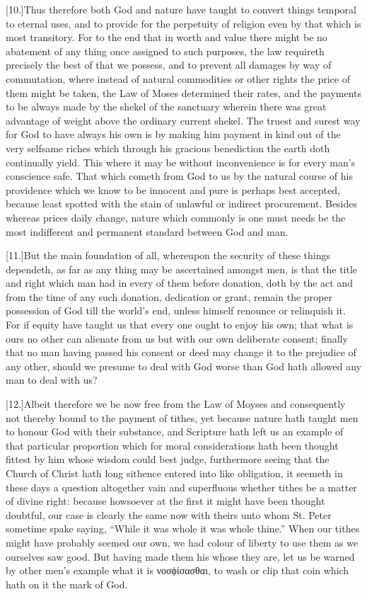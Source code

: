[10.]Thus therefore both God and nature have taught to convert things temporal to eternal uses, and to provide for the perpetuity of religion even by that which is most transitory. For to the end that in worth and value there might be no abatement of any thing once assigned to such purposes, the law requireth precisely the best of that we possess, and to prevent all damages by way of commutation, where instead of natural commodities or other rights the price of them might be taken, the Law of Moses determined their rates, and the payments to be always made by the shekel of the sanctuary wherein there was great advantage of weight above the ordinary current shekel. The truest and surest way for God to have always his own is by making him payment in kind out of the very selfsame riches which through his gracious benediction the earth doth continually yield. This where it may be without inconvenience is for every man’s conscience safe. That which cometh from God to us by the natural course of his providence which we know to be innocent and pure is perhaps best accepted, because least spotted with the stain of unlawful or indirect procurement. Besides whereas prices daily change, nature which commonly is one must needs be the most indifferent and permanent standard between God and man.

[11.]But the main foundation of all, whereupon the security of these things dependeth, as far as any thing may be ascertained  amongst men,
 is that the title and right which man had in every of them before donation, doth by the act and from the time of any such donation, dedication or grant, remain the proper possession of God till the world’s end, unless himself renounce or relinquish it. For if equity have taught us that every one ought to enjoy his own; that what is ours no other can alienate from us but with our own deliberate consent; finally that no man having passed his consent or deed may change it to the prejudice of any other, should we presume to deal with God worse than God hath allowed any man to deal with us?

[12.]Albeit therefore we be now free from the Law of Moyses and consequently not thereby bound to the payment of tithes, yet because nature hath taught men to honour God with their substance, and Scripture hath left us an example of that particular proportion which for moral considerations hath been thought fittest by him whose wisdom could best judge, furthermore seeing that the Church of Christ hath long sithence entered into like obligation, it seemeth in these days a question altogether vain and superfluous whether tithes be a matter of divine right: because howsoever at the first it might have been thought doubtful, our case is clearly the same now with theirs unto whom St. Peter sometime spake saying, “While it was whole it was whole thine.” When our tithes might have probably seemed our own, we had colour of liberty to use them as we ourselves saw good. But having made them his whose they are, let us be warned by other men’s example what it is νοσϕίσασθαι, to wash or clip that coin which hath on it the mark of God.




